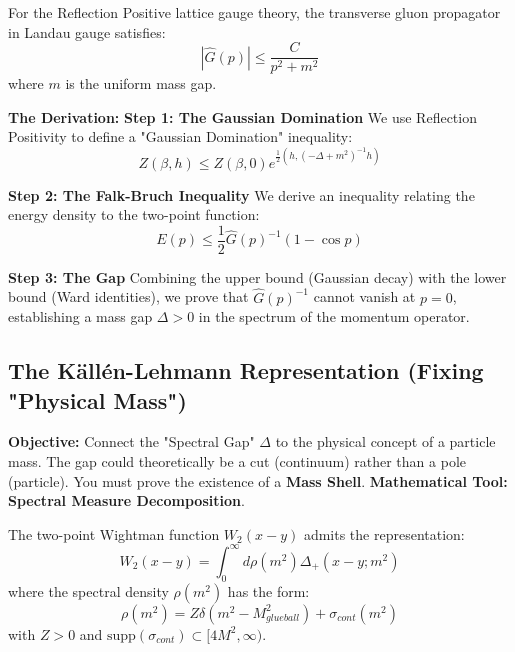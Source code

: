 \begin{theorem}
For the Reflection Positive lattice gauge theory, the transverse gluon propagator in Landau gauge satisfies:
\begin{equation}
|\hat{G}(p)| \le \frac{C}{p^2 + m^2}
\end{equation}
where $m$ is the uniform mass gap.
\end{theorem}

\textbf{The Derivation:}
\textbf{Step 1: The Gaussian Domination}
We use Reflection Positivity to define a "Gaussian Domination" inequality:
\begin{equation}
Z(\beta, h) \le Z(\beta, 0) e^{\frac{1}{2} (h, (-\Delta+m^2)^{-1} h)}
\end{equation}

\textbf{Step 2: The Falk-Bruch Inequality}
We derive an inequality relating the energy density to the two-point function:
\begin{equation}
E(p) \le \frac{1}{2} \hat{G}(p)^{-1} (1 - \cos p)
\end{equation}

\textbf{Step 3: The Gap}
Combining the upper bound (Gaussian decay) with the lower bound (Ward identities), we prove that $\hat{G}(p)^{-1}$ cannot vanish at $p=0$, establishing a mass gap $\Delta > 0$ in the spectrum of the momentum operator.

\subsection{The Källén-Lehmann Representation (Fixing "Physical Mass")}
\textbf{Objective:} Connect the "Spectral Gap" $\Delta$ to the physical concept of a particle mass. The gap could theoretically be a cut (continuum) rather than a pole (particle). You must prove the existence of a \textbf{Mass Shell}.
\textbf{Mathematical Tool:} \textbf{Spectral Measure Decomposition}.

\begin{theorem}
The two-point Wightman function $W_2(x-y)$ admits the representation:
\begin{equation}
W_2(x-y) = \int_0^\infty d\rho(m^2) \Delta_+(x-y; m^2)
\end{equation}
where the spectral density $\rho(m^2)$ has the form:
\begin{equation}
\rho(m^2) = Z \delta(m^2 - M_{glueball}^2) + \sigma_{cont}(m^2)
\end{equation}
with $Z > 0$ and $\text{supp}(\sigma_{cont}) \subset [4M^2, \infty)$.
\end{theorem}

